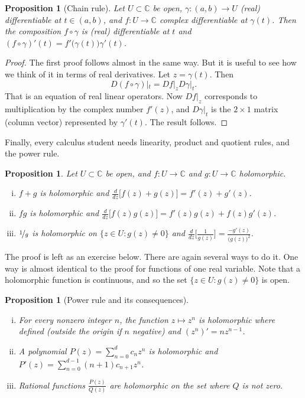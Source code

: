 \documentclass[12pt,openany]{book}
\newcommand{\C}{{\mathbb{C}}}
\theoremstyle{plain}
\newtheorem{prop}[thm]{Proposition}
\theoremstyle{remark}
\theoremstyle{definition}
\theoremstyle{exercise}
\theoremstyle{example}
\begin{document}
\begin{prop}[Chain rule]
%
\label{prop:chainrule2}%
Let $U \subset \C$ be open,
$\gamma \colon (a,b) \to U$ (real) differentiable at $t \in (a,b)$,
and $f \colon U \to \C$ complex differentiable at $\gamma(t)$.
Then the composition $f \circ \gamma$ is (real) differentiable
at $t$ and $(f \circ \gamma)'(t) = f'\bigl(\gamma(t)\bigr) \gamma'(t)$.
\end{prop}

\begin{proof}
The first proof follows almost in the same way.  But it is useful to see
how we think of it in terms of real derivatives.
Let $z = \gamma(t)$.  Then 
\begin{equation*}
D(f \circ \gamma)|_{t} =
Df|_z D\gamma|_{t} .
\end{equation*}
That is an equation of real linear operators.  Now $Df|_z$ corresponds
to multiplication by the complex number $f'(z)$, and $D\gamma|_{t}$
is the $2 \times 1$ matrix (column vector) represented by $\gamma'(t)$.
The result follows.
\end{proof}

Finally, every calculus student needs linearity, product and quotient rules,
and the power rule.

\begin{prop} \label{prop:sumproddiv}
Let $U \subset \C$ be open, and $f \colon U \to \C$ and
$g \colon U \to \C$ holomorphic.
\begin{enumerate}[(i)]
\item
$f+g$ is holomorphic and $\frac{d}{dz}\bigl[ f(z)+g(z) \bigr] = f'(z) + g'(z)$.
\item
$fg$ is holomorphic and $\frac{d}{dz}\bigl[f(z) g(z) \bigr] = f'(z)g(z) + f(z)g'(z)$.
\item
$\nicefrac{1}{g}$ is holomorphic on $\bigl\{ z \in U : g(z) \not= 0 \bigr\}$ and
$\frac{d}{dz}\bigl[\frac{1}{g(z)}\bigr] = \frac{-g'(z)}{{\bigl(g(z)\bigr)}^2}$.
\end{enumerate}
\end{prop}

The proof is left as an exercise below.  There are again several ways
to do it.  One way is almost identical to the
proof for functions of one real variable.
Note that
a holomorphic function is continuous, and so the set
$\bigl\{ z \in U : g(z) \not= 0 \bigr\}$ is open.

\begin{prop}[Power rule and its consequences] \label{prop:powerrule}
\leavevmode
\begin{enumerate}[(i)]
\item For every nonzero integer $n$, the function $z \mapsto z^n$ is holomorphic
where defined (outside the origin if $n$ negative) and $(z^n)' = n z^{n-1}$.
\item
A polynomial $P(z) = \sum_{n=0}^d c_n z^n$ is
holomorphic and
$P'(z) = \sum_{n=0}^{d-1} (n+1) c_{n+1} z^n$.
\item Rational functions $\frac{P(z)}{Q(z)}$
are holomorphic on the set where $Q$ is not zero.
\end{enumerate}
\end{prop}
\end{document}
